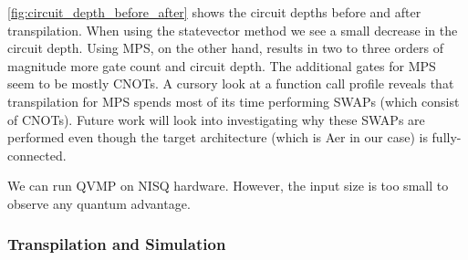 \documentclass[11pt]{article}
\theoremstyle{definition}
\theoremstyle{remark}
\begin{document}
\cref{fig:circuit_depth_before_after} shows the circuit depths before and after
transpilation. When using the statevector method we see a small decrease in the
circuit depth. Using MPS, on the other hand, results in two to three orders of
magnitude more gate count and circuit depth. The additional gates for MPS seem
to be mostly CNOTs. A cursory look at a function call profile reveals that
transpilation for MPS spends most of its time performing SWAPs (which consist of
CNOTs). Future work will look into investigating why these SWAPs are performed
even though the target architecture (which is Aer in our case) is
fully-connected.

We can run QVMP on NISQ hardware. However, the input size is too small to
observe any quantum advantage.

\subsubsection{Transpilation and Simulation}
\end{document}
